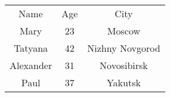 \documentclass{article}
\begin{document}
\begin{tabular}{ccc}
Name & Age & City \\
Mary & 23 & Moscow \\
Tatyana & 42 & Nizhny Novgorod \\
Alexander & 31 & Novosibirsk \\
Paul & 37 & Yakutsk
\end{tabular}
\end{document}
